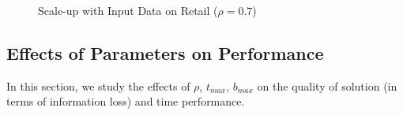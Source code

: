 \begin{figure}[th]
\centering
{}
\caption{Scale-up with Input Data on Retail ($\rho=0.7$)}\label{fig:scale}
\end{figure}

\subsection{Effects of Parameters on Performance}\label{sec:eval:effect}
In this section, we study the effects of $\rho$, $t_{max}$, $b_{max}$ on the
quality of solution (in terms of information loss) and time performance.

